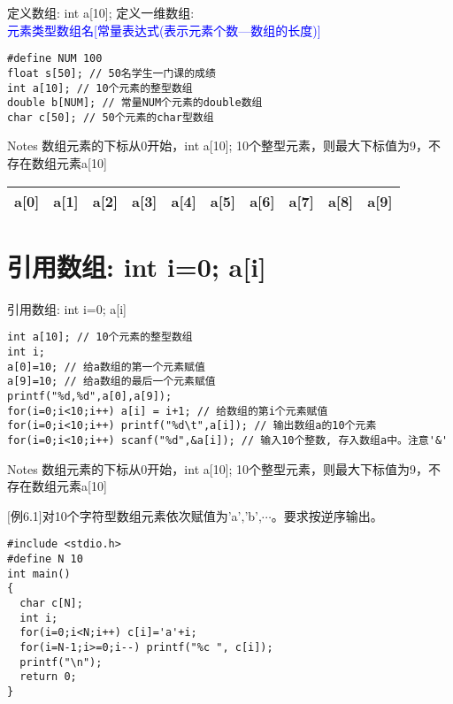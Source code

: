 \begin{frame}{定义数组: int a[10];}
定义一维数组: \\
\textcolor{blue}{元素类型\quad 数组名[常量表达式(表示元素个数---数组的长度)]}
\vspace{-0.2cm}
\begin{lstlisting}
#define NUM 100
float s[50]; // 50名学生一门课的成绩
int a[10]; // 10个元素的整型数组
double b[NUM]; // 常量NUM个元素的double数组
char c[50]; // 50个元素的char型数组
\end{lstlisting}
\vspace{-0.2cm}
\begin{block}{Notes}
	数组元素的下标从0开始，int a[10]; 10个整型元素，则最大下标值为9，不存在数组元素a[10]
\end{block}
\begin{tabular}{|c|c|c|c|c|c|c|c|c|c|}
	\hline 
	a[0] & a[1] & a[2] & a[3] & a[4] & a[5] & a[6] & a[7] & a[8] & a[9] \\ 
	\hline 
\end{tabular} 
\end{frame}

\section{引用数组: int i=0; a[i]}

\begin{frame}{引用数组: int i=0; a[i]}
\begin{lstlisting}
int a[10]; // 10个元素的整型数组
int i;
a[0]=10; // 给a数组的第一个元素赋值
a[9]=10; // 给a数组的最后一个元素赋值
printf("%d,%d",a[0],a[9]);
for(i=0;i<10;i++) a[i] = i+1; // 给数组的第i个元素赋值
for(i=0;i<10;i++) printf("%d\t",a[i]); // 输出数组a的10个元素
for(i=0;i<10;i++) scanf("%d",&a[i]); // 输入10个整数, 存入数组a中。注意'&'
\end{lstlisting}
\begin{block}{Notes}
	数组元素的下标从0开始，int a[10]; 10个整型元素，则最大下标值为9，不存在数组元素a[10]
\end{block}
\end{frame}

\begin{frame}
$[$例6.1$]$对10个字符型数组元素依次赋值为'a','b',$\cdots$。要求按逆序输出。
\pause
\begin{lstlisting}
#include <stdio.h>
#define N 10
int main()
{
  char c[N];
  int i;
  for(i=0;i<N;i++) c[i]='a'+i; 
  for(i=N-1;i>=0;i--) printf("%c ", c[i]);
  printf("\n");
  return 0;
}
\end{lstlisting}
\end{frame}

